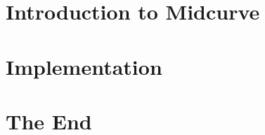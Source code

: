 \section[Introduction]{Introduction to Midcurve}


\section[Impl]{Implementation}


\section[End]{The End}


